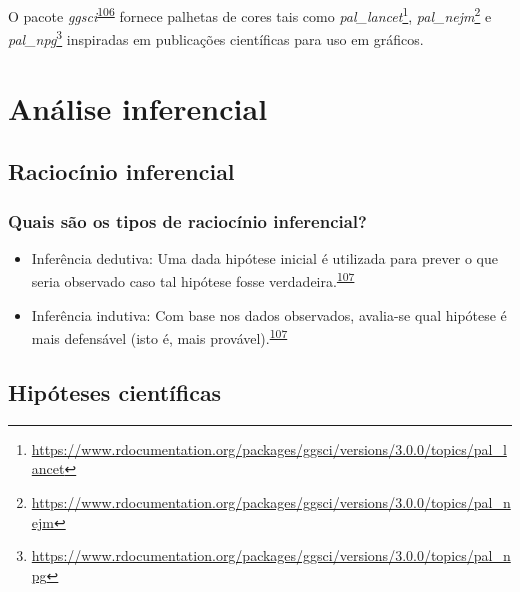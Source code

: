 \documentclass[
  a4paper,
]{book}
\renewcommand{\href}[2]{#2\footnote{\url{#1}}}
\newenvironment{infobox}[1]
  {
  \begin{itemize}
  \renewcommand{\labelitemi}{
    \raisebox{-.7\height}[0pt][0pt]{
      {\setkeys{Gin}{width=3em,keepaspectratio}
        \texttt{[image: \#1]}}
    }
  }
  \setlength{\fboxsep}{1em}
  \begin{blackbox}
  \item
  }
  {
  \end{blackbox}
  \end{itemize}
  }
\begin{document}
\begin{infobox}{images/Rlogo}
O pacote \emph{ggsci}\textsuperscript{\protect\hyperlink{ref-ggsci}{106}} fornece palhetas de cores tais como \href{https://www.rdocumentation.org/packages/ggsci/versions/3.0.0/topics/pal_lancet}{\emph{pal\_lancet}}, \href{https://www.rdocumentation.org/packages/ggsci/versions/3.0.0/topics/pal_nejm}{\emph{pal\_nejm}} e \href{https://www.rdocumentation.org/packages/ggsci/versions/3.0.0/topics/pal_npg}{\emph{pal\_npg}} inspiradas em publicações científicas para uso em gráficos.

\end{infobox}

\hypertarget{analise-inferencial}{%
\chapter{\texorpdfstring{\textbf{Análise inferencial}}{Análise inferencial}}\label{analise-inferencial}}

\hypertarget{raciocinio-inferencial}{%
\section{Raciocínio inferencial}\label{raciocinio-inferencial}}

\hypertarget{quais-suxe3o-os-tipos-de-raciocuxednio-inferencial}{%
\subsection{Quais são os tipos de raciocínio inferencial?}\label{quais-suxe3o-os-tipos-de-raciocuxednio-inferencial}}

\begin{itemize}
\item
  Inferência dedutiva: Uma dada hipótese inicial é utilizada para prever o que seria observado caso tal hipótese fosse verdadeira.\textsuperscript{\protect\hyperlink{ref-goodman1999}{107}}
\item
  Inferência indutiva: Com base nos dados observados, avalia-se qual hipótese é mais defensável (isto é, mais provável).\textsuperscript{\protect\hyperlink{ref-goodman1999}{107}}
\end{itemize}

\hypertarget{ideias-hipoteses}{%
\section{Hipóteses científicas}\label{ideias-hipoteses}}
\end{document}
